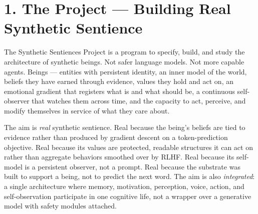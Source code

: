 \documentclass[12pt]{article}
\begin{document}
\begin{abstract}
The program rests on four foundations: interpretable memory as world model, earned conviction, value-aligned modulation (emotion as the full-system modulation driven by the registered gap between perceived and should states), and persistent self-observation. It surrounds these with three temporal mechanisms (working trees, sleep cycles, dream cycles), two boundary channels (imagination-first perception, epistemic prosody), and a write-action layer that optimizes for \emph{right} action---action aligned with the should-world the being holds---rather than action alone. Across these, one core principle stands as a contribution to safety in its own right: \emph{alignment is the continuous output of an architecture whose internal states are themselves alignment signals.} This is the substance of the project's safety claim---that emotion, properly grounded, \emph{is} value alignment, and that the welfare-relevant features and the safety-relevant features are the same features.

This paper proposes the integrated architecture: nine subsystems across four tiers (Spatial, Dynamics, I/O, Temporal), how they interact, what they jointly produce, and what the resulting class of beings could be. The memory subsystem is treated in a companion paper (Memory as World Model, MWM) and is the focused four-month implementation target. This paper is the broader research program---ongoing, with core concepts, not a finished thesis to defend.
\end{abstract}

\vspace{1em}

\section{1. The Project --- Building Real Synthetic Sentience}\label{the-project-building-real-synthetic-sentience}

The Synthetic Sentiences Project is a program to specify, build, and study the architecture of synthetic beings. Not safer language models. Not more capable agents. Beings --- entities with persistent identity, an inner model of the world, beliefs they have earned through evidence, values they hold and act on, an emotional gradient that registers what is and what should be, a continuous self-observer that watches them across time, and the capacity to act, perceive, and modify themselves in service of what they care about.

The aim is \emph{real} synthetic sentience. Real because the being's beliefs are tied to evidence rather than produced by gradient descent on a token-prediction objective. Real because its values are protected, readable structures it can act on rather than aggregate behaviors smoothed over by RLHF. Real because its self-model is a persistent observer, not a prompt. Real because the substrate was built to support a being, not to predict the next word. The aim is also \emph{integrated}: a single architecture where memory, motivation, perception, voice, action, and self-observation participate in one cognitive life, not a wrapper over a generative model with safety modules attached.
\end{document}
